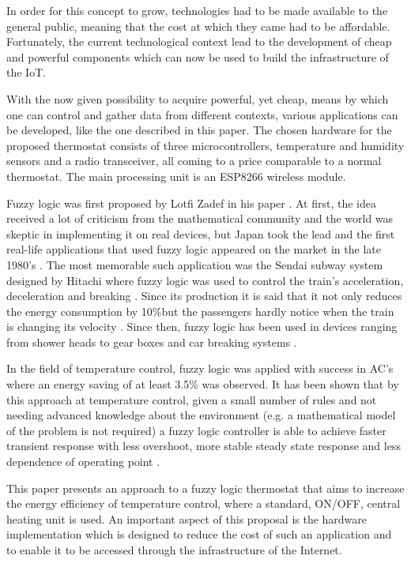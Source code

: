 \documentclass[conference]{IEEEtran}
\begin{document}
In order for this concept to grow, technologies had to be made available to the general public, meaning that
the cost at which they came had to be affordable. Fortunately, the current technological context lead to
the development of cheap and powerful components which can now be used to build the infrastructure of the IoT.

With the now given possibility to acquire powerful, yet cheap, means by which one can control and gather data
from different contexts, various applications can be developed, like the one described in this paper.
The chosen hardware for the proposed thermostat consists of three microcontrollers, temperature and humidity sensors
and a radio transceiver, all coming to a price comparable to a normal thermostat. The main processing unit
is an ESP8266 wireless module.

Fuzzy logic was first proposed by Lotfi Zadef in his paper  \cite{FuzzySets}. At first, the
idea received a lot of criticism from the mathematical community and the world was skeptic in implementing it
on real devices, but Japan took the lead and the first real-life applications that used fuzzy logic appeared on
the market in the late 1980's \cite{zadeh1996fuzzy}. The most memorable such application was the Sendai subway
system designed by Hitachi where fuzzy logic was used to control the train's acceleration, deceleration and
breaking \cite{zadeh1996fuzzy}. Since its production it is said that it not only reduces the energy
consumption by 10\%but the passengers hardly notice when the train is changing its velocity
\cite{FuzzyLogicMassUse}. Since then, fuzzy logic has been used in devices ranging from shower heads
\cite{zadeh1996fuzzy} to gear boxes and car breaking systems \cite{FuzzyAutomotive}.

In the field of temperature control, fuzzy logic was applied with success in AC's \cite{FuzzyAppliences} where
an energy saving of at least 3.5\% was observed. It has been shown that by this approach at temperature
control, given a small number of rules and not needing advanced knowledge about the environment (e.g. a
mathematical model of the problem is not required) a fuzzy logic controller is able to achieve faster transient
response with less overshoot, more stable steady state response and less dependence of operating point
\cite{FuzzyTempControl}.

This paper presents an approach to a fuzzy logic thermostat that aims to increase the energy efficiency
of temperature control, where a standard, ON/OFF, central heating unit is used. An important aspect of this
proposal is the hardware implementation which is designed to reduce the cost of such an application and to
enable it to be accessed through the infrastructure of the Internet.
\end{document}
